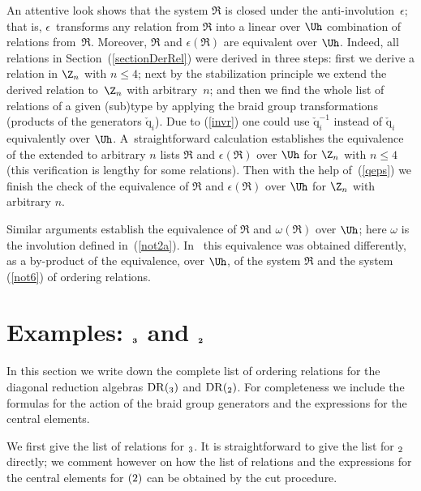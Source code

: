 \documentclass[pdftex]{sigma}
\def\q{\check{\mathrm q}}\def\Q{\mathrm{Q}}\def\r#1{(\ref{#1})}\let\rf=\r
\numberwithin{equation}{section}
\begin{document}
\begin{remark}
An attentive look shows that the system $\mathfrak{R}$ is closed under the anti-involution~$\epsilon$; that is, $\epsilon$~transforms any
relation from $\mathfrak{R}$ into a linear over $\Uh$ combination of relations from~$\mathfrak{R}$. Moreover, $\mathfrak{R}$ and
$\epsilon (\mathfrak{R})$ are equivalent over $\Uh$. Indeed, all relations in Section~\rf{sectionDerRel} were derived in
three steps: f\/irst we derive a relation in $\Z_n$ with $n\leq 4$; next by the stabilization principle we extend the derived relation
to~$\Z_n$ with arbitrary~$n$;
and then we f\/ind the whole list of relations of a given (sub)type by applying the braid group transformations (products of the
generators $\q_i$). Due to \rf{invr} one could use $\q_i^{-1}$ instead of $\q_i$ equivalently over
$\Uh$. A~straightforward calculation establishes the equivalence of the extended to arbitrary $n$ lists $\mathfrak{R}$ and
$\epsilon (\mathfrak{R})$ over $\Uh$ for $\Z_n$ with
$n\leq 4$ (this verif\/ication is lengthy for some relations).
Then with the help of~\rf{qeps} we f\/inish the check of the equivalence of $\mathfrak{R}$ and $\epsilon (\mathfrak{R})$ over $\Uh$ for $\Z_n$ with
arbitrary $n$.


Similar arguments establish  the equivalence of $\mathfrak{R}$ and $\omega (\mathfrak{R})$ over $\Uh$; here $\omega$ is the involution def\/ined
in~\rf{not2a}. In~\cite{KO3} this equivalence was obtained dif\/ferently, as a by-product of the equivalence, over $\Uh$, of the system $\mathfrak{R}$ and
the system  \rf{not6} of ordering relations.
\end{remark}


\section[Examples: $\sl_3$ and $\sl_2$]{Examples: $\boldsymbol{\sl_3}$ and $\boldsymbol{\sl_2}$}

In this section we write down the complete list of ordering relations for the diagonal reduction algebras
${\mathrm{DR}}(\sl_3)$ and ${\mathrm{DR}}(\sl_2)$. For
completeness we include the formulas for the action of the braid group generators and the expressions for the central elements.


We f\/irst give the list of relations for $\sl_3$. It is straightforward to give the list for $\sl_2$ directly; we comment however on how the list of relations and the
expressions for the central elements for $\sl(2)$ can be obtained by the cut procedure.
\end{document}
